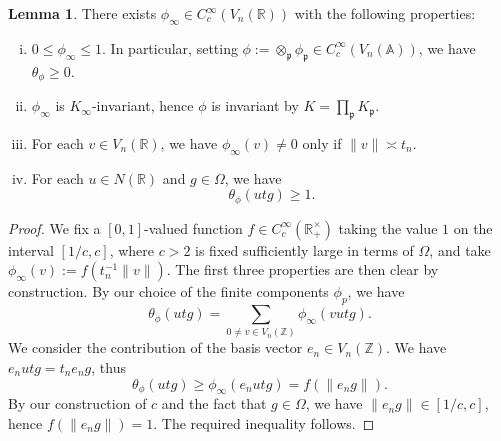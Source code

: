 \documentclass[reqno]{amsart}
\theoremstyle{plain} \newtheorem{theorem} {Theorem}
\theoremstyle{definition} \newtheorem{definition} [theorem] {Definition}
\theoremstyle{itplain} %
\newtheorem{lemma}[theorem]{Lemma}
\numberwithin{equation}{section}
\numberwithin{theorem}{section}
\renewcommand{\geq}{\geqslant}
\renewcommand{\leq}{\leqslant}
\begin{document}
\begin{lemma}\label{lem:sub-gln:let-r-be}
  There exists $\phi_\infty \in C_c^\infty(V_n(\mathbb{R}))$ with the following properties:
  \begin{enumerate}[(i)]
  \item $0 \leq \phi_\infty \leq 1$.  In particular, setting $\phi := \otimes_{\mathfrak{p}} \phi_\mathfrak{p} \in C_c^\infty(V_n(\mathbb{A}))$, we have $\theta_{\phi} \geq 0$.
  \item $\phi_\infty$ is $K_\infty$-invariant, hence $\phi$ is invariant by $K = \prod_\mathfrak{p} K_\mathfrak{p}$.
  \item For each $v \in V_n(\mathbb{R})$, we have $\phi_\infty(v) \neq 0$ only if $\|v\| \asymp t_n$.
  \item For each $u \in N(\mathbb{R})$ and $g \in \Omega$, we have
    \begin{equation}\label{eq:theta_phiu-r-g}
      \theta_\phi(u t g) \geq 1.
    \end{equation}
  \end{enumerate}
\end{lemma}
\begin{proof}
  We fix a $[0,1]$-valued function $f \in C_c^\infty(\mathbb{R}^\times_+)$ taking the value $1$ on the interval $[1/c,c]$, where $c > 2$ is fixed sufficiently large in terms of $\Omega$, and take $\phi_\infty(v) := f(t_n^{-1} \|v\|)$.  The first three properties are then clear by construction.  By our choice of the finite components $\phi_p$, we have
  \begin{equation*}
    \theta_\phi(u t g) = \sum _{0 \neq v \in V_n(\mathbb{Z})}
    \phi_\infty(v u t g).
  \end{equation*}
  We consider the contribution of the basis vector $e_n \in V_n(\mathbb{Z})$.  We have $e_n u t g = t_n e_n g$, thus
  \begin{equation*}
    \theta_\phi(u t g) \geq \phi_\infty(e_n u t g)
    = f(\|e_n g\|).
  \end{equation*}
  By our construction of $c$ and the fact that $g \in \Omega$, we have $\|e_n g\| \in [1/c,c]$, hence $f( \|e_n g\|) = 1$.  The required inequality follows.
\end{proof}
\end{document}
